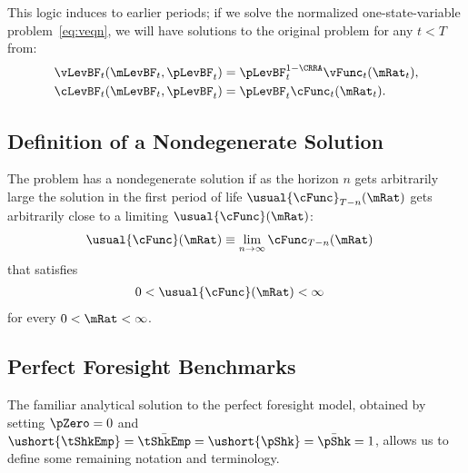 \documentclass[ProjectDLO]{subfiles}
\begin{document}
This logic induces to earlier periods; if we solve the
normalized one-state-variable problem~\eqref{eq:veqn}, we
will have solutions to the original problem for any $t<T$
from:
\begin{align*}
  \vLevBF_{t}(\mLevBF_{t},\pLevBF_{t})  & = \pLevBF_{t}^{1-\CRRA}\vFunc_{t}(\mRat_{t}),
  \\ \cLevBF_{t}(\mLevBF_{t},\pLevBF_{t})  & = \pLevBF_{t}\cFunc_{t}(\mRat_{t}).
\end{align*}

\hypertarget{Definition-of-a-Nondegenerate-Solution}{}
\subsection{Definition of a Nondegenerate Solution}

The problem has a nondegenerate solution if as the horizon $n$ gets arbitrarily large the solution in the first period of life $\usual{\cFunc}_{T-n}(\mRat)$ gets arbitrarily close to a limiting $\usual{\cFunc}(\mRat)$:
\begin{align}
  \usual{\cFunc}(\mRat)  & \equiv  \lim_{n \rightarrow \infty} \cFunc_{T-n}(\mRat)
\end{align}
that satisfies
\begin{align}
  0 & < \usual{\cFunc}(\mRat) <  \infty
\end{align}
for every $0 < \mRat < \infty$.%

\hypertarget{Perfect-Foresight-Benchmarks}{}
\subsection{Perfect Foresight Benchmarks}

The familiar analytical solution to the perfect foresight model, obtained by setting $\pZero=0$ and $\ushort{\tShkEmp}=\bar{\tShkEmp}=\ushort{\pShk}=\bar{\pShk}=1$, allows us to define some remaining notation and terminology.

\hypertarget{Human-Wealth}{}
\end{document}
